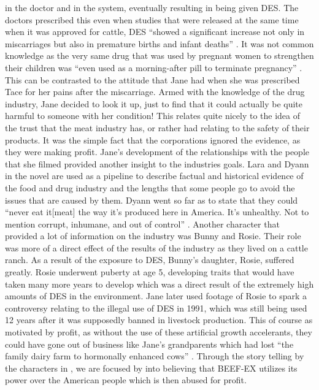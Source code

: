 \documentclass{article}
\begin{document}
in the doctor and in the system, eventually resulting in being given DES.
The doctors prescribed this even when studies that were released at the same
time when it was approved for cattle, DES ``showed a significant increase
not only in miscarriages but also in premature births and infant deaths''
\cite[Ch. 6]{ozeki1998my}. It was not common knowledge as the very same drug
that was used by pregnant women to strengthen their children was ``even used
as a morning-after pill to terminate pregnancy'' \cite[Ch. 6]{ozeki1998my}.
This can be contrasted to the attitude that Jane had when she was prescribed
Tace for her pains after the miscarriage. Armed with the knowledge of the
drug industry, Jane decided to look it up, just to find that it could
actually be quite harmful to someone with her condition! This relates quite
nicely to the idea of the trust that the meat industry has, or rather had
relating to the safety of their products. It was the simple fact that the
corporations ignored the evidence, as they were making profit. Jane's
development of the relationships with the people that she filmed provided
another insight to the industries goals. Lara and Dyann in the novel are
used as a pipeline to describe factual and historical evidence of the food
and drug industry and the lengths that some people go to avoid the issues
that are caused by them. Dyann went so far as to state that they could
``never eat it[meat] the way it’s produced here in America. It’s unhealthy.
Not to mention corrupt, inhumane, and out of control'' \cite[Ch.
8]{ozeki1998my}. Another character that provided a lot of information on the
industry was Bunny and Rosie. Their role was more of a direct effect of the
results of the industry as they lived on a cattle ranch. As a result of the
exposure to DES, Bunny's daughter, Rosie, suffered greatly. Rosie underwent
puberty at age 5, developing traits that would have taken many more years to
develop which was a direct result of the extremely high amounts of DES in
the environment. Jane later used footage of Rosie to spark a controversy
relating to the illegal use of DES in 1991, which was still being used 12
years after it was supposedly banned in livestock production. This of course
as motivated by profit, as without the use of these artificial growth
accelerants, they could have gone out of business like Jane's grandparents
which had lost ``the family dairy farm to hormonally enhanced cows''
\cite[Ch. 6]{ozeki1998my}. Through the story telling by the characters in
, we are focused by \citeauthor{ozeki1998my} into
believing that BEEF-EX utilizes its power over the American people which is
then abused for profit.
\end{document}
